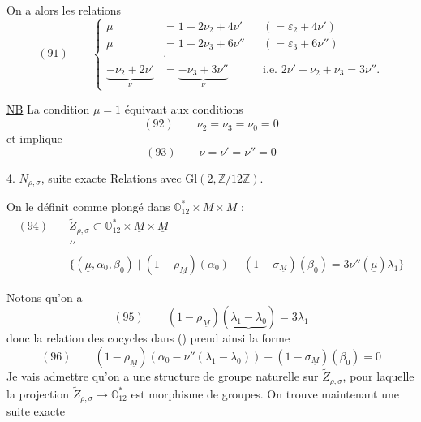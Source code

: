 On a alors les relations
\[
(91)\qquad
\left\{\begin{aligned}
\mu&=1-2\nu_2+4\nu'&&({}=\varepsilon_2+4\nu')\\
\mu&=1-2\nu_3+6\nu''&&({}=\varepsilon_3+6\nu'')\\[6pt]
&\cdot\\[-3pt]
\underbrace{-\nu_2+2\nu'}_{\nu}&=
\underbrace{-\nu_3+3\nu''}_{\nu}
&&\text{i.e. }2\nu'-\nu_2+\nu_3=3\nu''.
\end{aligned}\right.
\]

\uline{NB} La condition $\underline\mu=1$ équivaut aux conditions
\[
(92)\qquad \nu_2=\nu_3=\nu_0=0
\]
et implique
\[
(93)\qquad \nu=\nu'=\nu''=0
\]

4. 
$N_{\rho,\sigma}$, 
suite exacte
Relations avec $\mathrm{Gl}(2,\mathbb Z/12\mathbb Z)$.

On le définit comme plongé dans
$\mathbb O_{12}^{*}\times\underline M\times\underline M$ :
\[
\begin{aligned}
(94)\quad&\widetilde Z_{\rho,\sigma}
\subset \mathbb O_{12}^{*}\times\underline M\times\underline M\\[-2pt]
&\prime\prime\\[-2pt]
&\bigl\{(\underline\mu,\alpha_0,\beta_0)\mid
(1-\rho_{\underline M})(\alpha_0)-(1-\sigma_{\underline M})(\beta_0)
=3\nu''(\underline\mu)\lambda_1\bigr\}
\end{aligned}
\]

Notons qu'on a
\[
(95)\qquad (1-\rho_{\underline M})
(\underbrace{\lambda_1-\lambda_0})=3\lambda_1
\]
donc la relation des cocycles dans ()
prend ainsi la forme
\[
(96)\qquad
(1-\rho_{\underline M})(\alpha_0-\nu''(\lambda_1-\lambda_0))
-(1-\sigma_{\underline M})(\beta_0)=0
\]
Je vais admettre  qu'on a une structure de groupe naturelle sur
$\widetilde Z_{\rho,\sigma}$, pour laquelle la projection
$\widetilde Z_{\rho,\sigma}\to\mathbb O_{12}^{*}$
est morphisme de groupes. On trouve maintenant une suite exacte

